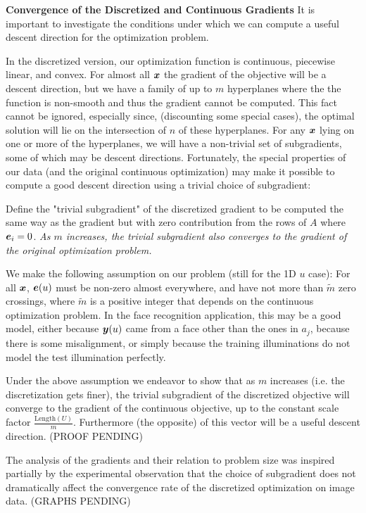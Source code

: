 {\bf Convergence of the Discretized and Continuous Gradients } It is important
to investigate the conditions under which we can compute a useful descent
direction for the optimization problem.  

In the discretized version, our optimization function is continuous, piecewise
linear, and convex.  For almost all ${\boldsymbol{x}}$ the gradient of the objective will be
a descent direction, but we have a family of up to $m$ hyperplanes where the
the function is non-smooth and thus the gradient cannot be computed.  This fact
cannot be ignored, especially since, (discounting some special cases), the
optimal solution will lie on the intersection of $n$ of these hyperplanes.  For
any ${\boldsymbol{x}}$ lying on one or more of the hyperplanes, we will have a non-trivial
set of subgradients, some of which may be descent directions.  Fortunately, the
special properties of our data (and the original continuous optimization) may
make it possible to compute a good descent direction using a trivial choice of
subgradient:

Define the "trivial subgradient" of the discretized gradient to be computed the
same way as the gradient but with zero contribution from the rows of $A$ where
$\boldsymbol{e}_i=0$. {\em As $m$ increases, the trivial subgradient also converges to the
gradient of the original optimization problem.} 

We make the following assumption on our problem (still for the 1D $u$ case):
For all ${\boldsymbol{x}}$, $\boldsymbol{e}(u)$ must be non-zero almost everywhere, and have not more
than $\tilde m$ zero crossings, where $\tilde m$ is a positive integer that
depends on the continuous optimization problem.  In the face recognition
application, this may be a good model, either because ${\boldsymbol{y}}(u)$ came from a face
other than the ones in $a_j$, because there is some misalignment, or simply
because the training illuminations do not model the test illumination
perfectly.

Under the above assumption we endeavor to show that as $m$ increases (i.e. the
discretization gets finer), the trivial subgradient of the discretized
objective will converge to the gradient of the continuous objective, up to the
constant scale factor $\frac{\textrm{Length}(U)}{m}$.  Furthermore (the
opposite) of this vector will be a useful descent direction.  (PROOF PENDING)

The analysis of the gradients and their relation to problem size was inspired
partially by the experimental observation that the choice of subgradient does
not dramatically affect the convergence rate of the discretized optimization on
image data. (GRAPHS PENDING)

